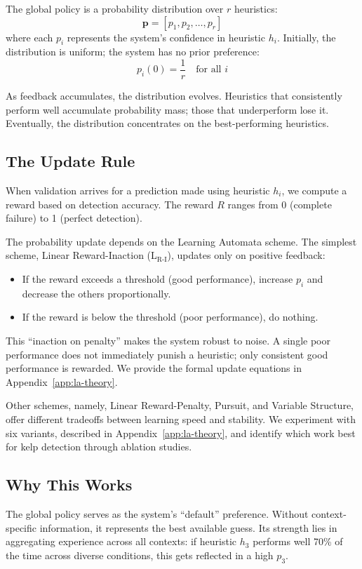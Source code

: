 \documentclass[11pt,a4paper]{article}
\begin{document}
The global policy is a probability distribution over $r$ heuristics:
\[
\mathbf{p} = [p_1, p_2, \ldots, p_r]
\]
where each $p_i$ represents the system's confidence in heuristic $h_i$. Initially, the distribution is uniform; the system has no prior preference:
\[
p_i(0) = \frac{1}{r} \quad \text{for all } i
\]

As feedback accumulates, the distribution evolves. Heuristics that consistently perform well accumulate probability mass; those that underperform lose it. Eventually, the distribution concentrates on the best-performing heuristics.

\subsection{The Update Rule}

When validation arrives for a prediction made using heuristic $h_i$, we compute a reward based on detection accuracy. The reward $R$ ranges from 0 (complete failure) to 1 (perfect detection).

The probability update depends on the Learning Automata scheme. The simplest scheme, Linear Reward-Inaction (L$_{\text{R-I}}$), updates only on positive feedback:

\begin{itemize}
    \item If the reward exceeds a threshold (good performance), increase $p_i$ and decrease the others proportionally.
    \item If the reward is below the threshold (poor performance), do nothing.
\end{itemize}

This ``inaction on penalty'' makes the system robust to noise. A single poor performance does not immediately punish a heuristic; only consistent good performance is rewarded. We provide the formal update equations in Appendix~\ref{app:la-theory}.

Other schemes, namely, Linear Reward-Penalty, Pursuit, and Variable Structure, offer different tradeoffs between learning speed and stability. We experiment with six variants, described in Appendix~\ref{app:la-theory}, and identify which work best for kelp detection through ablation studies.

\subsection{Why This Works}

The global policy serves as the system's ``default'' preference. Without context-specific information, it represents the best available guess. Its strength lies in aggregating experience across all contexts: if heuristic $h_3$ performs well 70\% of the time across diverse conditions, this gets reflected in a high $p_3$.
\end{document}
